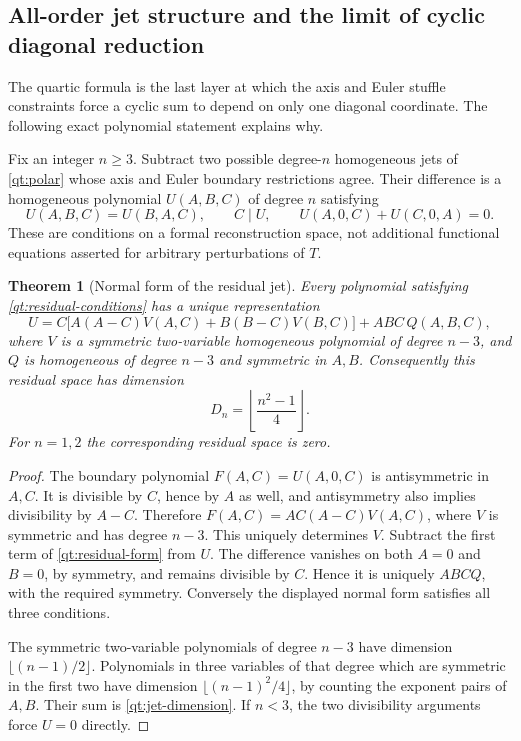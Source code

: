 \documentclass[11pt]{article}
\numberwithin{equation}{section}
\newtheorem{theorem}{Theorem}[section]
\theoremstyle{definition}
\theoremstyle{remark}
\begin{document}
\subsection{All-order jet structure and the limit of cyclic diagonal reduction}

The quartic formula is the last layer at which the axis and Euler
stuffle constraints force a cyclic sum to depend on only one diagonal
coordinate. The following exact polynomial statement explains why.

Fix an integer $n\ge3$. Subtract two possible degree-$n$ homogeneous
jets of \eqref{qt:polar} whose axis and Euler boundary restrictions
agree. Their difference is a homogeneous polynomial $U(A,B,C)$
of degree $n$ satisfying
\begin{equation}\label{qt:residual-conditions}
 U(A,B,C)=U(B,A,C),\qquad C\mid U,\qquad
 U(A,0,C)+U(C,0,A)=0.
\end{equation}
These are conditions on a formal reconstruction space, not additional
functional equations asserted for arbitrary perturbations of $T$.

\begin{theorem}[Normal form of the residual jet]\label{qt:all-order-space}
Every polynomial satisfying \eqref{qt:residual-conditions} has a unique
representation
\begin{equation}\label{qt:residual-form}
 U=C\bigl[A(A-C)V(A,C)+B(B-C)V(B,C)\bigr]+ABC\,Q(A,B,C),
\end{equation}
where $V$ is a symmetric two-variable homogeneous polynomial of degree
$n-3$, and $Q$ is homogeneous of degree $n-3$ and symmetric in $A,B$.
Consequently this residual space has dimension
\begin{equation}\label{qt:jet-dimension}
 D_n=\left\lfloor\frac{n^2-1}{4}\right\rfloor.
\end{equation}
For $n=1,2$ the corresponding residual space is zero.
\end{theorem}
\begin{proof}
The boundary polynomial $F(A,C)=U(A,0,C)$ is antisymmetric in $A,C$.
It is divisible by $C$, hence by $A$ as well, and antisymmetry also
implies divisibility by $A-C$. Therefore
$F(A,C)=AC(A-C)V(A,C)$, where $V$ is symmetric and has degree
$n-3$. This uniquely determines $V$. Subtract the first term of
\eqref{qt:residual-form} from $U$. The difference vanishes on both
$A=0$ and $B=0$, by symmetry, and remains divisible by $C$.
Hence it is uniquely $ABCQ$, with the required symmetry.
Conversely the displayed normal form satisfies all three conditions.

The symmetric two-variable polynomials of degree $n-3$ have dimension
$\lfloor(n-1)/2\rfloor$. Polynomials in three variables of that degree
which are symmetric in the first two have dimension
$\lfloor(n-1)^2/4\rfloor$, by counting the exponent pairs of $A,B$.
Their sum is \eqref{qt:jet-dimension}. If $n<3$, the two divisibility
arguments force $U=0$ directly.
\end{proof}
\end{document}
